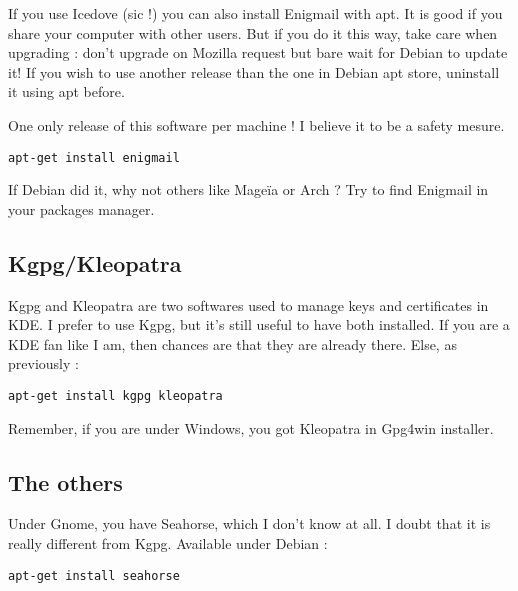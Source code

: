 If you use Icedove (sic !) you can also install Enigmail with apt. It is
good if you share your computer with other users. But if you do it this way, take care when upgrading : don't upgrade on
Mozilla request but bare wait for Debian to update it! If you wish to use another release than the one in Debian apt store,
uninstall it using apt before.

\begin{warning}
One only release of this software per machine ! I believe
it to be a safety mesure.
\end{warning}

\begin{lstlisting}
apt-get install enigmail
\end{lstlisting}

\begin{notice}
If Debian did it, why not others like Mageïa or Arch ? Try to
find Enigmail in your packages manager.
\end{notice}

\subsection{Kgpg/Kleopatra}\label{kgpgkleopatra}

Kgpg and Kleopatra are two softwares used to manage keys and
certificates in KDE. I prefer to use Kgpg, but it's still useful to have
both installed. If you are a KDE fan like I am, then chances are that they are already
there. Else, as previously :

\begin{lstlisting}
apt-get install kgpg kleopatra
\end{lstlisting}

Remember, if you are under Windows, you got Kleopatra in Gpg4win
installer.

\subsection{The others}\label{the-others-1}

Under Gnome, you have Seahorse, which I don't know at all. I doubt that
it is really different from Kgpg. Available under Debian :

\begin{lstlisting}
apt-get install seahorse
\end{lstlisting}
